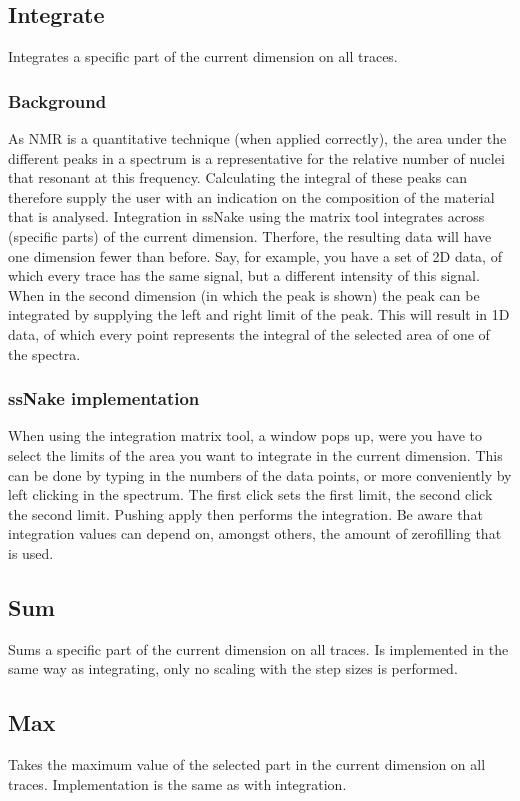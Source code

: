 \documentclass[11pt,a4paper]{article}
\begin{document}
\subsection{Integrate}
Integrates a specific part of the current dimension on all traces.

\subsubsection*{Background}
As NMR is a quantitative technique (when applied correctly), the area under the different peaks in a spectrum is a representative for the relative number of nuclei that resonant at this frequency. Calculating the integral of these peaks can therefore supply the user with an indication on the composition of the material that is analysed. Integration in ssNake using the matrix tool integrates across (specific parts) of the current dimension. Therfore, the resulting data will have one dimension fewer than before. Say, for example, you have a set of 2D data, of which every trace has the same signal, but a different intensity of this signal. When in the second dimension (in which the peak is shown) the peak can be integrated by supplying the left and right limit of the peak. This will result in 1D data, of which every point represents the integral of the selected area of one of the spectra.

\subsubsection*{ssNake implementation}
When using the integration matrix tool, a window pops up, were you have to select the limits of the area you want to integrate in the current dimension. This can be done by typing in the numbers of the data points, or more conveniently by left clicking in the spectrum. The first click sets the first limit, the second click the second limit. Pushing apply then performs the integration. Be aware that integration values can depend on, amongst others, the amount of zerofilling that is used.

\subsection{Sum}
Sums a specific part of the current dimension on all traces. Is implemented in the same way as integrating, only no scaling with the step sizes is performed.

\subsection{Max}
Takes the maximum value of the selected part in the current dimension on all traces. Implementation is the same as with integration.
\end{document}
